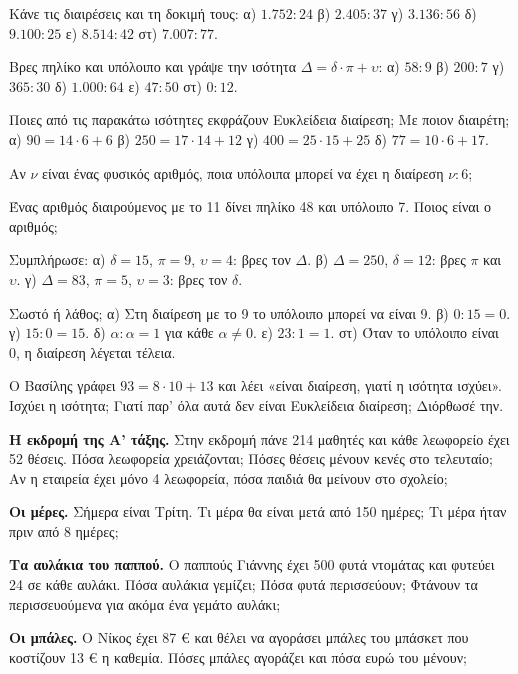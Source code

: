 

\ex Κάνε τις διαιρέσεις και τη δοκιμή τους: α) $1.752:24$ \quad β) $2.405:37$ \quad γ) $3.136:56$ \quad δ) $9.100:25$ \quad ε) $8.514:42$ \quad στ) $7.007:77$.

\ex Βρες πηλίκο και υπόλοιπο και γράψε την ισότητα $\Delta=\delta\cdot\pi+\upsilon$: α) $58:9$ \quad β) $200:7$ \quad γ) $365:30$ \quad δ) $1.000:64$ \quad ε) $47:50$ \quad στ) $0:12$.

\ex Ποιες από τις παρακάτω ισότητες εκφράζουν Ευκλείδεια διαίρεση; Με ποιον διαιρέτη; α) $90=14\cdot 6+6$ \quad β) $250=17\cdot 14+12$ \quad γ) $400=25\cdot 15+25$ \quad δ) $77=10\cdot 6+17$.

\ex Αν $\nu$ είναι ένας φυσικός αριθμός, ποια υπόλοιπα μπορεί να έχει η διαίρεση $\nu:6$;

\ex Ένας αριθμός διαιρούμενος με το 11 δίνει πηλίκο 48 και υπόλοιπο 7. Ποιος είναι ο αριθμός;

\ex Συμπλήρωσε: α) $\delta=15$, $\pi=9$, $\upsilon=4$: βρες τον $\Delta$. \quad β) $\Delta=250$, $\delta=12$: βρες $\pi$ και $\upsilon$. \quad γ) $\Delta=83$, $\pi=5$, $\upsilon=3$: βρες τον $\delta$.

\ex Σωστό ή λάθος; α) Στη διαίρεση με το 9 το υπόλοιπο μπορεί να είναι 9. \quad β) $0:15=0$. \quad γ) $15:0=15$. \quad δ) $\alpha:\alpha=1$ για κάθε $\alpha\neq 0$. \quad ε) $23:1=1$. \quad στ) Όταν το υπόλοιπο είναι 0, η διαίρεση λέγεται τέλεια.

\ex Ο Βασίλης γράφει $93=8\cdot 10+13$ και λέει «είναι διαίρεση, γιατί η ισότητα ισχύει». Ισχύει η ισότητα; Γιατί παρ' όλα αυτά δεν είναι Ευκλείδεια διαίρεση; Διόρθωσέ την.


\ex \textbf{Η εκδρομή της Α’ τάξης.} Στην εκδρομή πάνε 214 μαθητές και κάθε λεωφορείο έχει 52 θέσεις. Πόσα λεωφορεία χρειάζονται; Πόσες θέσεις μένουν κενές στο τελευταίο; Αν η εταιρεία έχει μόνο 4 λεωφορεία, πόσα παιδιά θα μείνουν στο σχολείο;

\ex \textbf{Οι μέρες.} Σήμερα είναι Τρίτη. Τι μέρα θα είναι μετά από 150 ημέρες; Τι μέρα ήταν πριν από 8 ημέρες;

\ex \textbf{Τα αυλάκια του παππού.} Ο παππούς Γιάννης έχει 500 φυτά ντομάτας και φυτεύει 24 σε κάθε αυλάκι. Πόσα αυλάκια γεμίζει; Πόσα φυτά περισσεύουν; Φτάνουν τα περισσευούμενα για ακόμα ένα γεμάτο αυλάκι;

\ex \textbf{Οι μπάλες.} Ο Νίκος έχει 87 € και θέλει να αγοράσει μπάλες του μπάσκετ που κοστίζουν 13 € η καθεμία. Πόσες μπάλες αγοράζει και πόσα ευρώ του μένουν;

